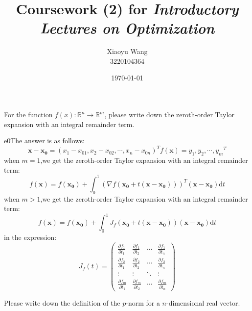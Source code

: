 \documentclass{article}
\title{Coursework (2) for \emph{Introductory Lectures on Optimization}}
\author{Xiaoyu Wang \\ 3220104364}
\date{\today}
\newcommand{\xB}{\mathbf{x}}
\newcommand{\aB}{\mathbf{a}}
\newcommand{\tB}{\mathbf{t}}
\begin{document}
\maketitle

\begin{excercise}\label{e0}
For the function $f(x): \mathbb{R}^n \rightarrow \mathbb{R}^m$, please write down the zeroth-order Taylor expansion with an integral remainder term.
\end{excercise}

\begin{SOLUTION}{e0}The answer is as follows:\\
$$
\xB-\mathbf{x_0}=(x_1-x_{01},x_2-x_{02},\cdots,x_n-x_{0n})^T
f(\xB) = {y_1,y_2,\cdots,y_m}^T
$$
when $m = 1 $,we get the zeroth-order Taylor expansion with an integral remainder term:
\[	
	f(\xB)=f(\mathbf{x_0})+\int_0^1 \left( \nabla f(\mathbf{x_0}+t(\xB-\mathbf{x_0}))\right)^{T}(\xB-\mathbf{x_0}) \mathrm{d}t
\]
when $m > 1$,we get the zeroth-order Taylor expansion with an integral remainder term:
\[
	f(\xB)=f(\mathbf{x_0})+\int_0^1  J_f(\mathbf{x_0}+t(\xB-\mathbf{x_0}))(\xB-\mathbf{x_0}) \mathrm{d}t
\] 
in the expression:\\
\[ 
J_f(t) = \begin{pmatrix} \frac{\partial f_1}{\partial t_1} & 
	\frac{\partial f_1}{\partial t_2} & \cdots & 
	\frac{\partial f_1}{\partial t_n} \\ 
	\frac{\partial f_2}{\partial t_1} & 
	\frac{\partial f_2}{\partial t_2} & 
	\cdots & \frac{\partial f_2}{\partial t_n} \\ 
	\vdots & \vdots & \ddots & \vdots \\ 
	\frac{\partial f_m}{\partial t_1} & 
	\frac{\partial f_m}{\partial t_2} & \cdots & 
	\frac{\partial f_m}{\partial t_n} \end{pmatrix} 
\]



\end{SOLUTION}

\begin{excercise}\label{e1}
Please write down the definition of the $p$-norm for a $n$-dimensional real vector.
\end{excercise}
\end{document}
